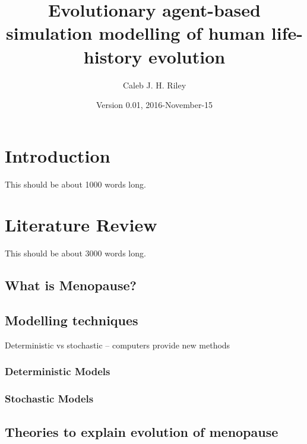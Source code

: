 \documentclass[authoryearcitations]{UoYCSproject}
\author{Caleb J. H. Riley}
\title{Evolutionary agent-based simulation modelling of human life-history evolution}
\date{Version 0.01, 2016-November-15}
\begin{document}
\maketitle
\listoffigures
\listoftables

\cleardoublepage

\chapter{Introduction}
\label{cha:Introduction}
This should be about 1000 words long.

\chapter{Literature Review}
\label{cha:Literature Review}
This should be about 3000 words long.

\section{What is Menopause?}

\section{Modelling techniques}
Deterministic vs stochastic -- computers provide new methods
\subsection{Deterministic Models}
\subsection{Stochastic Models}

\section{Theories to explain evolution of menopause}
\end{document}
